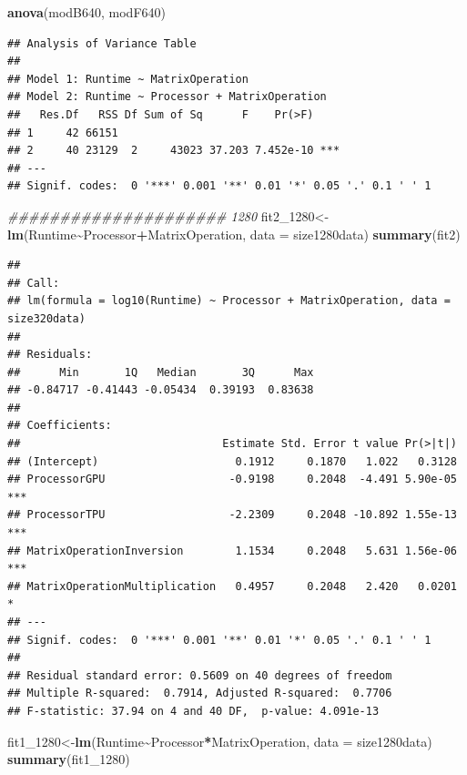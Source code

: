 \documentclass[
]{article}
\newenvironment{Shaded}{\begin{snugshade}}{\end{snugshade}}
\newcommand{\CommentTok}[1]{\textcolor[rgb]{0.56,0.35,0.01}{\textit{#1}}}
\newcommand{\DataTypeTok}[1]{\textcolor[rgb]{0.13,0.29,0.53}{#1}}
\newcommand{\DecValTok}[1]{\textcolor[rgb]{0.00,0.00,0.81}{#1}}
\newcommand{\KeywordTok}[1]{\textcolor[rgb]{0.13,0.29,0.53}{\textbf{#1}}}
\newcommand{\NormalTok}[1]{#1}
\newcommand{\OperatorTok}[1]{\textcolor[rgb]{0.81,0.36,0.00}{\textbf{#1}}}
\begin{document}
\begin{Shaded}
\begin{Highlighting}[]
\KeywordTok{anova}\NormalTok{(modB640, modF640)}
\end{Highlighting}
\end{Shaded}

\begin{verbatim}
## Analysis of Variance Table
## 
## Model 1: Runtime ~ MatrixOperation
## Model 2: Runtime ~ Processor + MatrixOperation
##   Res.Df   RSS Df Sum of Sq      F    Pr(>F)    
## 1     42 66151                                  
## 2     40 23129  2     43023 37.203 7.452e-10 ***
## ---
## Signif. codes:  0 '***' 0.001 '**' 0.01 '*' 0.05 '.' 0.1 ' ' 1
\end{verbatim}

\begin{Shaded}
\begin{Highlighting}[]
\CommentTok{\#\#\#\#\#\#\#\#\#\#\#\#\#\#\#\#\#\#\#\#\# 1280}
\NormalTok{fit2\_}\DecValTok{1280}\NormalTok{\textless{}{-}}\KeywordTok{lm}\NormalTok{(Runtime}\OperatorTok{\textasciitilde{}}\NormalTok{Processor}\OperatorTok{+}\NormalTok{MatrixOperation, }\DataTypeTok{data =}\NormalTok{ size1280data)}
\KeywordTok{summary}\NormalTok{(fit2)}
\end{Highlighting}
\end{Shaded}

\begin{verbatim}
## 
## Call:
## lm(formula = log10(Runtime) ~ Processor + MatrixOperation, data = size320data)
## 
## Residuals:
##      Min       1Q   Median       3Q      Max 
## -0.84717 -0.41443 -0.05434  0.39193  0.83638 
## 
## Coefficients:
##                               Estimate Std. Error t value Pr(>|t|)    
## (Intercept)                     0.1912     0.1870   1.022   0.3128    
## ProcessorGPU                   -0.9198     0.2048  -4.491 5.90e-05 ***
## ProcessorTPU                   -2.2309     0.2048 -10.892 1.55e-13 ***
## MatrixOperationInversion        1.1534     0.2048   5.631 1.56e-06 ***
## MatrixOperationMultiplication   0.4957     0.2048   2.420   0.0201 *  
## ---
## Signif. codes:  0 '***' 0.001 '**' 0.01 '*' 0.05 '.' 0.1 ' ' 1
## 
## Residual standard error: 0.5609 on 40 degrees of freedom
## Multiple R-squared:  0.7914, Adjusted R-squared:  0.7706 
## F-statistic: 37.94 on 4 and 40 DF,  p-value: 4.091e-13
\end{verbatim}

\begin{Shaded}
\begin{Highlighting}[]
\NormalTok{fit1\_}\DecValTok{1280}\NormalTok{\textless{}{-}}\KeywordTok{lm}\NormalTok{(Runtime}\OperatorTok{\textasciitilde{}}\NormalTok{Processor}\OperatorTok{*}\NormalTok{MatrixOperation, }\DataTypeTok{data =}\NormalTok{ size1280data)}
\KeywordTok{summary}\NormalTok{(fit1\_}\DecValTok{1280}\NormalTok{)}
\end{Highlighting}
\end{Shaded}
\end{document}
